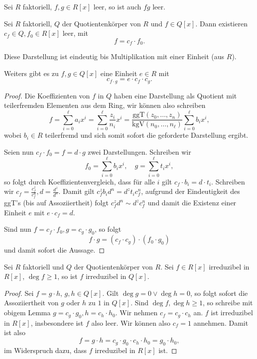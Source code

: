 \begin{corollary}
    Sei $R$ faktoriell, $f,g \in R[x]$ leer, so ist auch $fg$ leer.
\end{corollary}

\begin{lemma}
    Sei $R$ faktoriell, $Q$ der Quotientenkörper von $R$ und $f \in Q[x]$. Dann existieren $c_f \in Q, f_0 \in R[x]$ leer, mit
    $$ f = c_f \cdot f_0. $$

    Diese Darstellung ist eindeutig bis Multiplikation mit einer Einheit (aus $R$).

    Weiters gibt es zu $f, g \in Q[x]$ eine Einheit $e \in R$ mit
    $$ c_{f \cdot g} = e \cdot c_f \cdot c_g. $$
\end{lemma}

\begin{proof}
    Die Koeffizienten von $f$ in $Q$ haben eine Darstellung als Quotient mit teilerfremden Elementen aus dem Ring, wir können also schreiben
    $$ f = \sum_{i=0}^\ell a_i x^i = \sum_{i=0}^\ell \frac{z_i}{n_i} x^i = \frac{\mathrm{ggT}(z_0, \hdots, z_n)}{\mathrm{kgV}(n_0, \hdots, n_\ell)} \sum_{i=0}^\ell b_i x^i, $$
    wobei $b_i \in R$ teilerfremd und sich somit sofort die geforderte Darstellung ergibt.

    Seien nun $c_f \cdot f_0 = f = d \cdot g$ zwei Darstellungen. Schreiben wir
    $$ f_0 = \sum_{i=0}^\ell b_i x^i,\quad g = \sum_{i=0}^\ell t_i x^i, $$
    so folgt durch Koeffizientenvergleich, dass für alle $i$ gilt $c_f \cdot b_i = d \cdot t_i$. Schreiben wir $c_f = \frac{c_f^z}{c_f^n}, d = \frac{d^z}{d^n}$. Damit gilt $c_f^z b_i d^n = d^z t_i c_f^n$, aufgrund der Eindeutigkeit des ggT's (bis auf Assoziiertheit) folgt $c_f^z d^n \sim d^z c_f^n$ und damit die Existenz einer Einheit $e$ mit $e \cdot c_f = d$.

    Sind nun $f = c_f \cdot f_0, g = c_g \cdot g_0$, so folgt
    $$ f \cdot g = (c_f \cdot c_g) \cdot (f_0 \cdot g_0) $$
    und damit sofort die Aussage.
\end{proof}

\begin{lemma}
    Sei $R$ faktoriell und $Q$ der Quotientenkörper von $R$. Sei $f \in R[x]$ irreduzibel in $R[x]$, $\deg f \geq 1$, so ist $f$ irreduzibel in $Q[x]$.
\end{lemma}

\begin{proof}
    Sei $f = g \cdot h$, $g, h \in Q[x]$. Gilt $\deg g = 0 \lor \deg h = 0$, so folgt sofort die Assoziiertheit von $g$ oder $h$ zu $1$ in $Q[x]$. Sind $\deg f, \deg h \geq 1$, so schreibe mit obigem Lemma $g = c_g \cdot g_0, h = c_h \cdot h_0$. Wir nehmen \obda $c_f = c_g \cdot c_h$ an. $f$ ist irreduzibel in $R[x]$, insbesondere ist $f$ also leer. Wir können also \obda $c_f = 1$ annehmen. Damit ist also
    $$ f = g \cdot h = c_g \cdot g_0 \cdot c_h \cdot h_0 = g_0 \cdot h_0, $$
    im Widerspruch dazu, dass $f$ irreduzibel in $R[x]$ ist.
\end{proof}

